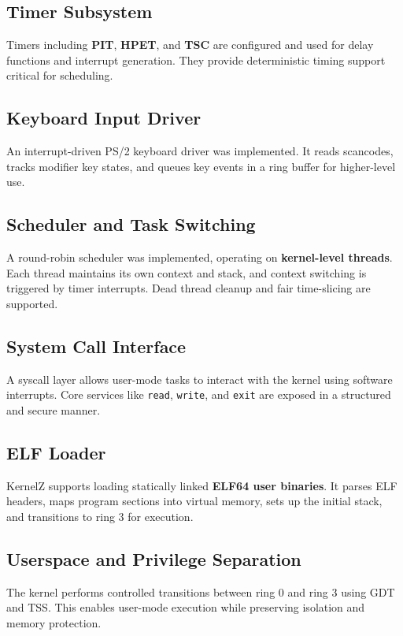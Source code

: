 \documentclass[12pt]{extarticle}
\begin{document}
\subsection{Timer Subsystem}
Timers including \textbf{PIT}, \textbf{HPET}, and \textbf{TSC} are configured and used for delay functions and interrupt generation. They provide deterministic timing support critical for scheduling.

\subsection{Keyboard Input Driver}
An interrupt-driven PS/2 keyboard driver was implemented. It reads scancodes, tracks modifier key states, and queues key events in a ring buffer for higher-level use.

\subsection{Scheduler and Task Switching}
A round-robin scheduler was implemented, operating on \textbf{kernel-level threads}. Each thread maintains its own context and stack, and context switching is triggered by timer interrupts. Dead thread cleanup and fair time-slicing are supported.

\subsection{System Call Interface}
A syscall layer allows user-mode tasks to interact with the kernel using software interrupts. Core services like \texttt{read}, \texttt{write}, and \texttt{exit} are exposed in a structured and secure manner.

\subsection{ELF Loader}
KernelZ supports loading statically linked \textbf{ELF64 user binaries}. It parses ELF headers, maps program sections into virtual memory, sets up the initial stack, and transitions to ring 3 for execution.

\subsection{Userspace and Privilege Separation}
The kernel performs controlled transitions between ring 0 and ring 3 using GDT and TSS. This enables user-mode execution while preserving isolation and memory protection.
\end{document}
